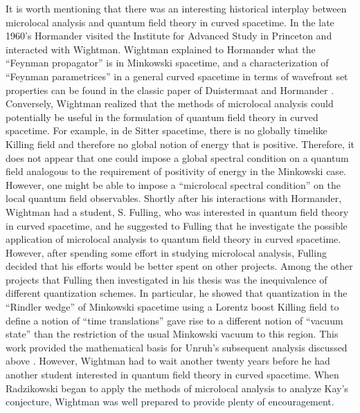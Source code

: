 \documentclass[12pt,epsf,amsfonts,amssymb]{article}
\begin{document}
It is worth mentioning that there was an interesting historical
interplay between microlocal analysis and quantum field theory in
curved spacetime. In the late 1960's Hormander visited the Institute
for Advanced Study in Princeton and interacted with Wightman. Wightman
explained to Hormander what the ``Feynman propagator'' is in Minkowski
spacetime, and a characterization of ``Feynman parametrices'' in a
general curved spacetime in terms of wavefront set properties can be
found in the classic paper of Duistermaat and Hormander
\cite{dh}. Conversely, Wightman realized that the methods of
microlocal analysis could potentially be useful in the formulation of
quantum field theory in curved spacetime. For example, in de Sitter
spacetime, there is no globally timelike Killing field and therefore
no global notion of energy that is positive. Therefore, it does not
appear that one could impose a global spectral condition on a quantum
field analogous to the requirement of positivity of energy in the
Minkowski case. However, one might be able to impose a ``microlocal
spectral condition'' on the local quantum field observables. Shortly
after his interactions with Hormander, Wightman had a student,
S. Fulling, who was interested in quantum field theory in curved
spacetime, and he suggested to Fulling that he investigate the
possible application of microlocal analysis to quantum field theory in
curved spacetime. However, after spending some effort in studying
microlocal analysis, Fulling decided that his efforts would be better
spent on other projects. Among the other projects that Fulling then
investigated in his thesis was the inequivalence of different
quantization schemes. In particular, he showed that quantization in
the ``Rindler wedge'' of Minkowski spacetime using a Lorentz boost
Killing field to define a notion of ``time translations'' gave rise to a
different notion of ``vacuum state'' than the restriction of the usual
Minkowski vacuum to this region. This work provided the mathematical
basis for Unruh's subsequent analysis discussed above
\cite{u2}. However, Wightman had to wait another twenty years before
he had another student interested in quantum field theory in curved
spacetime. When Radzikowski began to apply the methods of microlocal
analysis to analyze Kay's conjecture, Wightman was well prepared to provide
plenty of encouragement.
\end{document}
